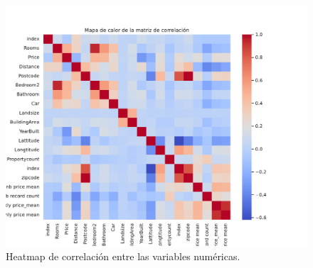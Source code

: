 \normalsize

\begin{figure} [!ht]
\begin{center}
\includegraphics[width=1.0\columnwidth]{img/correlacion.pdf}
\caption{Heatmap de correlación entre las variables numéricas.}
\label{f1}
\end{center}
\end{figure}


